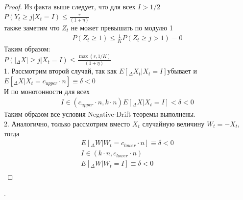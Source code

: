 \documentclass[times,specification,annotation]{itmo-student-thesis}
\newcommand{\Edelta}{$E[_{\Delta} X_t| X_t=I]$}
\begin{document}
    \begin{proof}
        Из факта выше следует, что для всех $I > 1/2$ \\
        $P(Y_t \geq j|X_t = I) \leq \frac{r}{(1 + \eta)}$ \\
        также заметим что $Z_t$ не может превышать по модулю 1 \\
        \begin{gather*}
            P(Z_t \geq 1) \leq \frac{1}{K}
            P(Z_t \geq j > 1)= 0
        \end{gather*}
        Таким образом: \\
        $P(|_{\Delta} X| \geq j|X_t = I) \leq \frac{\max(r, 1/K)}{(1 + \eta)}$ \\

        1. Рассмотрим второй случай, так как \Edelta убывает и $E[_{\Delta} X| X_t = c_{upper} \cdot n] \equiv \delta < 0$ \\
        И по монотонности для всех
        \begin{gather*}
            I \in (c_{upper} \cdot n, k \cdot n)
            E[_{\Delta} X| X_t = I] < \delta < 0
        \end{gather*}
        Таким образом все условия Negative-Drift теоремы выполнены. \\

        2. Аналогично, только рассмотрим вместо $X_t$ случайную величину $W_t = -X_t$, тогда \\
        \begin{gather*}
            E[_{\Delta} W| W_t = c_{lower} \cdot n] \equiv \delta < 0 \\
            I \in (k \cdot n, c_{lower} \cdot n)  \\
            E[_{\Delta} W| W_t = I] \equiv \delta < 0 \\
        \end{gather*}
    \end{proof}.
\end{document}
